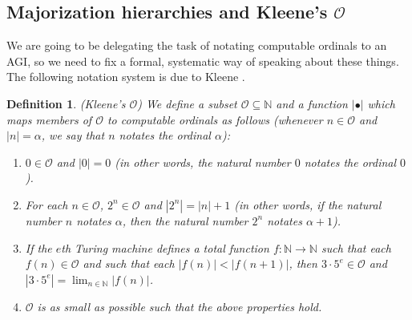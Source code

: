 \documentclass{article}
\newtheorem{definition}[theorem]{Definition}
\begin{document}
\subsection{Majorization hierarchies and Kleene's $\mathcal O$}

We are going to be delegating the task of notating computable
ordinals to an AGI, so we need to fix a formal, systematic way of speaking about these things.
The following notation system is due to Kleene \cite{kleene1938notation}.

\begin{definition}
(Kleene's $\mathcal O$)
We define a subset $\mathcal O\subseteq \mathbb N$ and a function $|\bullet|$ which maps
members of $\mathcal O$ to computable ordinals as follows (whenever $n\in\mathcal O$ and
$|n|=\alpha$, we say that $n$ \emph{notates} the ordinal $\alpha$):
\begin{enumerate}
    \item
        $0\in\mathcal O$ and $|0|=0$ (in other words, the natural number $0$ notates
        the ordinal $0$).
    \item
        For each $n\in\mathcal O$, $2^n\in\mathcal O$ and $|2^n|=|n|+1$ (in other words,
        if the natural number $n$ notates $\alpha$, then the natural number $2^n$
        notates $\alpha+1$).
    \item
        If the $e$th Turing machine defines a total function $f:\mathbb N\to\mathbb N$
        such that each $f(n)\in\mathcal O$ and such that each $|f(n)|<|f(n+1)|$,
        then $3\cdot 5^e\in\mathcal O$ and $|3\cdot 5^e|=\lim_{n\in\mathbb N}|f(n)|$.
    \item
        $\mathcal O$ is as small as possible such that the above properties hold.
\end{enumerate}
\end{definition}
\end{document}
